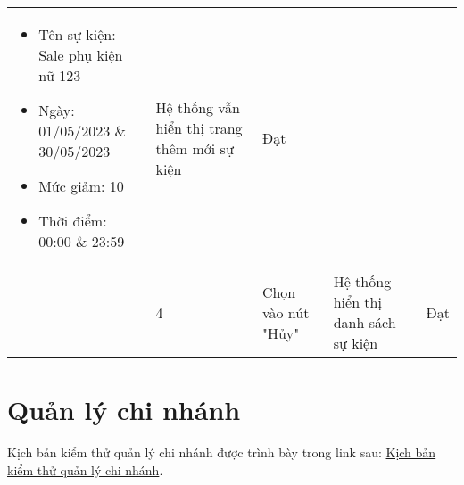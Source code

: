 {\begin{longtable}{| p{2.5cm}| p{1cm}| p{5.5cm}| p{4.5cm} | p{1.5cm} |}
\begin{itemize}
            \item Tên sự kiện: Sale phụ kiện nữ 123
            \item Ngày: 01/05/2023 \& 30/05/2023
            \item Mức giảm: 10
            \item Thời điểm: 00:00 \& 23:59 
        \end{itemize} & Hệ thống vẫn hiển thị trang thêm mới sự kiện & Đạt \\
        \cline{2-5}
         & 4 & Chọn vào nút "Hủy" & Hệ thống hiển thị danh sách sự kiện & Đạt \\
        \hline
    \end{longtable} 
}

\section{Quản lý chi nhánh}
Kịch bản kiểm thử quản lý chi nhánh được trình bày trong link sau:
\href{https://docs.google.com/spreadsheets/d/1e5iL2fXoOtwzTa8q8sMNZtwCF4_jOcqC/edit#gid=1624626876}{Kịch bản kiểm thử quản lý chi nhánh}.